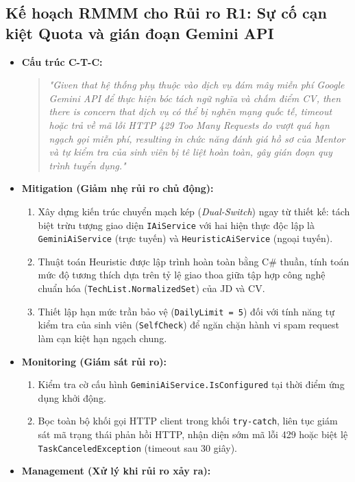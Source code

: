 \subsection{Kế hoạch RMMM cho Rủi ro R1: Sự cố cạn kiệt Quota và gián đoạn Gemini API}
\begin{itemize}
    \item \textbf{Cấu trúc C-T-C:} 
    \begin{quote}
    \textit{"Given that hệ thống phụ thuộc vào dịch vụ đám mây miễn phí Google Gemini API để thực hiện bóc tách ngữ nghĩa và chấm điểm CV, then there is concern that dịch vụ có thể bị nghẽn mạng quốc tế, timeout hoặc trả về mã lỗi HTTP 429 Too Many Requests do vượt quá hạn ngạch gọi miễn phí, resulting in chức năng đánh giá hồ sơ của Mentor và tự kiểm tra của sinh viên bị tê liệt hoàn toàn, gây gián đoạn quy trình tuyển dụng."}
    \end{quote}
    \item \textbf{Mitigation (Giảm nhẹ rủi ro chủ động):}
    \begin{enumerate}
        \item Xây dựng kiến trúc chuyển mạch kép (\textit{Dual-Switch}) ngay từ thiết kế: tách biệt trừu tượng giao diện \texttt{IAiService} với hai hiện thực độc lập là \texttt{GeminiAiService} (trực tuyến) và \texttt{HeuristicAiService} (ngoại tuyến).
        \item Thuật toán Heuristic được lập trình hoàn toàn bằng C\# thuần, tính toán mức độ tương thích dựa trên tỷ lệ giao thoa giữa tập hợp công nghệ chuẩn hóa (\texttt{TechList.NormalizedSet}) của JD và CV.
        \item Thiết lập hạn mức trần bảo vệ (\texttt{DailyLimit = 5}) đối với tính năng tự kiểm tra của sinh viên (\texttt{SelfCheck}) để ngăn chặn hành vi spam request làm cạn kiệt hạn ngạch chung.
    \end{enumerate}
    \item \textbf{Monitoring (Giám sát rủi ro):}
    \begin{enumerate}
        \item Kiểm tra cờ cấu hình \texttt{GeminiAiService.IsConfigured} tại thời điểm ứng dụng khởi động.
        \item Bọc toàn bộ khối gọi HTTP client trong khối \texttt{try-catch}, liên tục giám sát mã trạng thái phản hồi HTTP, nhận diện sớm mã lỗi 429 hoặc biệt lệ \texttt{TaskCanceledException} (timeout sau 30 giây).
    \end{enumerate}
    \item \textbf{Management (Xử lý khi rủi ro xảy ra):}

\end{itemize}
